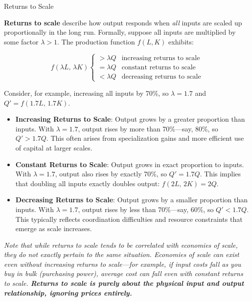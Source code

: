 \documentclass[10pt]{article}
\begin{document}
    \begin{core}{Returns to Scale}

      \textbf{Returns to scale} describe how output responds when \textit{all} inputs are scaled up proportionally in the long run. Formally, suppose all inputs are multiplied by some factor $\lambda > 1$. The production function $f(L, K)$ exhibits:

      \[
        f(\lambda L,\, \lambda K) \begin{cases} > \lambda Q & \text{increasing returns to scale} \\ 
        = \lambda Q & \text{constant returns to scale} \\ 
        < \lambda Q & \text{decreasing returns to scale} \end{cases}
      \]

      Consider, for example, increasing all inputs by 70\%, so $\lambda = 1.7$ and $Q' = f(1.7L,\, 1.7K)$.

      \begin{itemize}

        \item \textbf{Increasing Returns to Scale}: Output grows by a greater proportion than inputs. With $\lambda = 1.7$, output rises by more than 70\%---say, 80\%, so $Q' > 1.7Q$. This often arises from specialization gains and more efficient use of capital at larger scales.

        \item \textbf{Constant Returns to Scale}: Output grows in exact proportion to inputs. With $\lambda = 1.7$, output also rises by exactly 70\%, so $Q' = 1.7Q$. This implies that doubling all inputs exactly doubles output: $f(2L,\, 2K) = 2Q$.

        \item \textbf{Decreasing Returns to Scale}: Output grows by a smaller proportion than inputs. With $\lambda = 1.7$, output rises by less than 70\%---say, 60\%, so $Q' < 1.7Q$. This typically reflects coordination difficulties and resource constraints that emerge as scale increases.

      \end{itemize}

      \textit{Note that while returns to scale tends to be correlated with economies of scale, they do not exactly pertain to the same situation. Economies of scale can exist even without increasing returns to scale---for example, if input costs fall as you buy in bulk (purchasing power), average cost can fall even with constant returns to scale. \textbf{Returns to scale is purely about the physical input and output relationship, ignoring prices entirely.}}

    \end{core}
\end{document}
